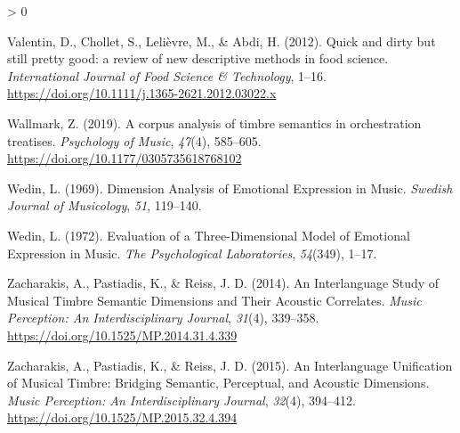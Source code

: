 \documentclass[
  english,
  man,floatsintext]{apa6}
\newlength{\cslhangindent}
\newenvironment{CSLReferences}[2] %
 {%
  \setlength{\parindent}{0pt}
  \ifodd #1 \everypar{\setlength{\hangindent}{\cslhangindent}}\ignorespaces\fi
  \ifnum #2 > 0
  \setlength{\parskip}{#2\baselineskip}
  \fi
 }%
 {}
\begin{document}
\begin{CSLReferences}{1}{0}
\leavevmode\hypertarget{ref-Valentin2012}{}%
Valentin, D., Chollet, S., Lelièvre, M., \& Abdi, H. (2012). {Quick and dirty but still pretty good: a review of new descriptive methods in food science}. \emph{International Journal of Food Science {\&} Technology}, 1--16. \url{https://doi.org/10.1111/j.1365-2621.2012.03022.x}

\leavevmode\hypertarget{ref-Wallmark2019}{}%
Wallmark, Z. (2019). {A corpus analysis of timbre semantics in orchestration treatises}. \emph{Psychology of Music}, \emph{47}(4), 585--605. \url{https://doi.org/10.1177/0305735618768102}

\leavevmode\hypertarget{ref-Wedin1969}{}%
Wedin, L. (1969). {Dimension Analysis of Emotional Expression in Music}. \emph{Swedish Journal of Musicology}, \emph{51}, 119--140.

\leavevmode\hypertarget{ref-Wedin1972}{}%
Wedin, L. (1972). {Evaluation of a Three-Dimensional Model of Emotional Expression in Music}. \emph{The Psychological Laboratories}, \emph{54}(349), 1--17.

\leavevmode\hypertarget{ref-Zacharakis2014}{}%
Zacharakis, A., Pastiadis, K., \& Reiss, J. D. (2014). {An Interlanguage Study of Musical Timbre Semantic Dimensions and Their Acoustic Correlates}. \emph{Music Perception: An Interdisciplinary Journal}, \emph{31}(4), 339--358. \url{https://doi.org/10.1525/MP.2014.31.4.339}

\leavevmode\hypertarget{ref-Zacharakis2015}{}%
Zacharakis, A., Pastiadis, K., \& Reiss, J. D. (2015). {An Interlanguage Unification of Musical Timbre: Bridging Semantic, Perceptual, and Acoustic Dimensions}. \emph{Music Perception: An Interdisciplinary Journal}, \emph{32}(4), 394--412. \url{https://doi.org/10.1525/MP.2015.32.4.394}

\end{CSLReferences}

\endgroup
\end{document}
